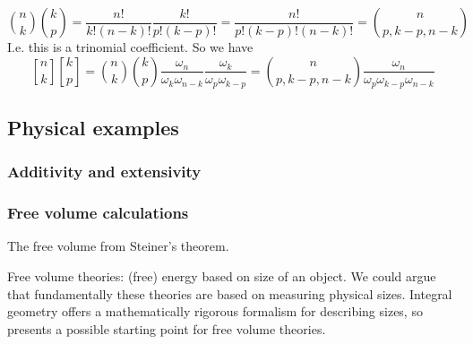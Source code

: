 \begin{equation*}
  {n \choose k} {k \choose p}
  =
  \frac{n!}{k!(n-k)!}
  \frac{k!}{p!(k-p)!}
  =
  \frac{n!}{p!(k-p)!(n-k)!}
  =
  {n \choose p, k-p, n-k}
\end{equation*}
I.e. this is a trinomial coefficient.
So we have
\begin{equation*}
  {n \brack k} {k \brack p}
  =
  {n \choose k}
  {k \choose p}
  \frac{\omega_n}{\omega_k \omega_{n-k}}
  \frac{\omega_k}{\omega_p \omega_{k-p}}
  =
  {n \choose p, k-p, n-k}
  \frac{\omega_n}{\omega_p \omega_{k-p} \omega_{n-k}}
\end{equation*}

\subsection{Physical examples}

\subsubsection{Additivity and extensivity}

\subsubsection{Free volume calculations}

The free volume from Steiner's theorem.

Free volume theories: (free) energy based on size of an object.
We could argue that fundamentally these theories are based on measuring physical sizes.
Integral geometry offers a mathematically rigorous formalism for describing sizes, so presents a possible starting point for free volume theories.
